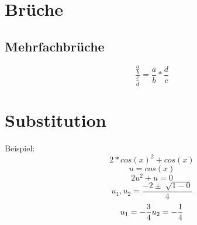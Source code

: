 \documentclass[a4]{article}
\begin{document}
\section{Brüche}
\label{sec-2}
\subsection{Mehrfachbrüche}
\label{sec-2-1}

\begin{equation}
\frac{\frac{a}{b}}{\frac{c}{d}} = \frac{a}{b} * \frac{d}{c}
\end{equation}

\section{Substitution}
\label{sec-3}

Beispiel:
\begin{equation}
2*cos(x)^2 + cos(x)
\end{equation}
\begin{equation}
u = cos(x)
\end{equation}
\begin{equation}
2u^2 + u = 0
\end{equation}
\begin{equation}
u_1, u_2 = \frac{-2 \pm \sqrt[]{1 - 0}}{4}
\end{equation}
\begin{equation}
u_1 = -\frac{3}{4}\\
u_2 = -\frac{1}{4}
\end{equation} 
\end{document}
